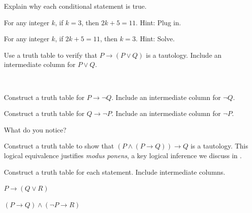 \begin{exer}[\exerP] %
\label{exer_explain_cond_true}
    Explain why each conditional statement is true.
    \begin{exerpart}
        \item For any integer $k$, if $k=3$, then $2k+5 = 11$.  Hint: Plug in.
        \item For any integer $k$, if $2k+5 = 11$, then $k=3$.  Hint: Solve.
    \end{exerpart}
\end{exer}

\begin{exer} [\exerP] %
\label{exer_verify_addition}
    Use a truth table to verify that $ P \to (P \lor Q)$ is a tautology.  Include an intermediate column for $P \lor Q$.
\end{exer}

\begin{exer}[\exerP] %
\label{exer_truthtable_PimpliesnegQ}
~
    \begin{exerpart}
        \item Construct a truth table for $P \to \neg Q$.  Include an intermediate column for $\neg Q$.
        \item Construct a truth table for $Q \to \neg P$. Include an intermediate column for $\neg P$.
        \item What do you notice?
    \end{exerpart}
\end{exer}

\begin{exer}[\exerU] %
\label{exer_truthtable_mp}
    Construct a truth table to show that $(P \land (P \to Q)) \to Q$ is a tautology.
    This logical equivalence justifies \emph{modus ponens}, a key logical inference we discuss in .
\end{exer}  

\begin{exer}[\exerU] %
\label{exer_truthtable_compound conditionals}
    Construct a truth table for each statement. Include intermediate columns.
        \begin{exerpart}
            \item $P \to (Q \lor R)$
            \item $(P \to Q) \land (\neg P \to R)$            
        \end{exerpart}
\end{exer}

